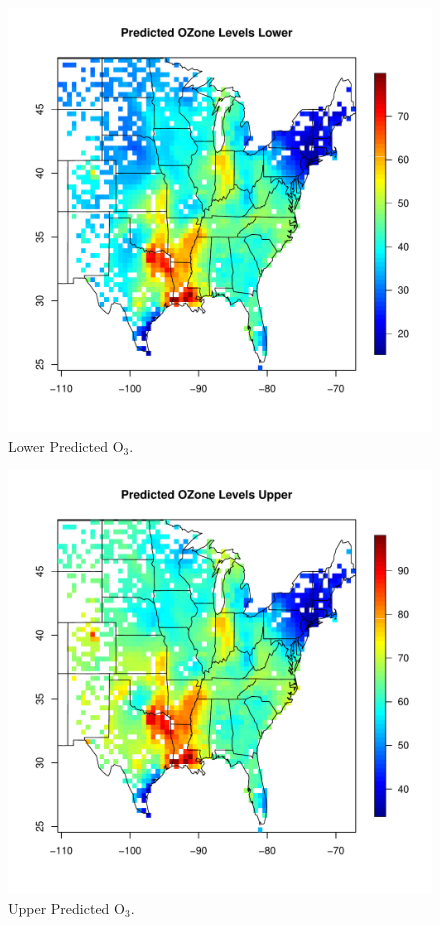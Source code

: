 \documentclass{article}                                                   %
\def\beginmyfig{\begin{figure}[htbp]\begin{center}}                       %
\def\endmyfig{\end{center}\end{figure}}                                   %
\begin{document}
    \beginmyfig
      \includegraphics{raw/lower.pdf}
      \caption{Lower Predicted O$_3$.}
    \endmyfig

    \beginmyfig
      \includegraphics{raw/upper.pdf}
      \caption{Upper Predicted O$_3$.}
    \endmyfig
\end{document}
